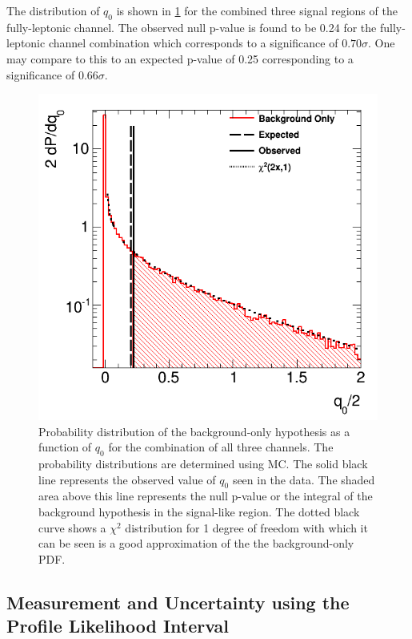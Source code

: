 The distribution of $q_0$ is 
shown in \fig\ref{fig:stat_measurement_significance} for the combined
three signal regions of the fully-leptonic
channel.  
The observed null p-value 
is found to be 0.24 for the fully-leptonic channel combination 
which corresponds to a significance
of $0.70 \sigma$.  One may compare to this to an expected 
p-value of 0.25 corresponding to 
a significance of $0.66 \sigma$.

\begin{figure}[ht!]
\centering
\includegraphics[width=0.80\columnwidth]{figures/statistics/significance/combination.png}
\caption{Probability distribution of the background-only hypothesis as a function of $q_0$ for 
the combination of all three channels. The probability distributions are determined 
using MC. The solid black line represents the observed 
value of $q_0$ seen in the data. The shaded area above
this line represents the null p-value or the 
integral of the background hypothesis in the signal-like region.
The dotted black curve shows a $\chi^2$ distribution for 1 degree of 
freedom with which 
it can be seen is a good approximation of the 
the background-only PDF.}
\label{fig:stat_measurement_significance}
\end{figure}


\subsection{Measurement and Uncertainty using the Profile Likelihood Interval}

